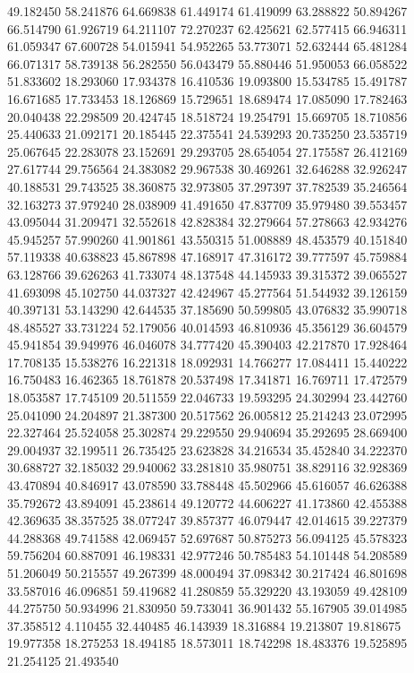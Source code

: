 49.182450
58.241876
64.669838
61.449174
61.419099
63.288822
50.894267
66.514790
61.926719
64.211107
72.270237
62.425621
62.577415
66.946311
61.059347
67.600728
54.015941
54.952265
53.773071
52.632444
65.481284
66.071317
58.739138
56.282550
56.043479
55.880446
51.950053
66.058522
51.833602
18.293060
17.934378
16.410536
19.093800
15.534785
15.491787
16.671685
17.733453
18.126869
15.729651
18.689474
17.085090
17.782463
20.040438
22.298509
20.424745
18.518724
19.254791
15.669705
18.710856
25.440633
21.092171
20.185445
22.375541
24.539293
20.735250
23.535719
25.067645
22.283078
23.152691
29.293705
28.654054
27.175587
26.412169
27.617744
29.756564
24.383082
29.967538
30.469261
32.646288
32.926247
40.188531
29.743525
38.360875
32.973805
37.297397
37.782539
35.246564
32.163273
37.979240
28.038909
41.491650
47.837709
35.979480
39.553457
43.095044
31.209471
32.552618
42.828384
32.279664
57.278663
42.934276
45.945257
57.990260
41.901861
43.550315
51.008889
48.453579
40.151840
57.119338
40.638823
45.867898
47.168917
47.316172
39.777597
45.759884
63.128766
39.626263
41.733074
48.137548
44.145933
39.315372
39.065527
41.693098
45.102750
44.037327
42.424967
45.277564
51.544932
39.126159
40.397131
53.143290
42.644535
37.185690
50.599805
43.076832
35.990718
48.485527
33.731224
52.179056
40.014593
46.810936
45.356129
36.604579
45.941854
39.949976
46.046078
34.777420
45.390403
42.217870
17.928464
17.708135
15.538276
16.221318
18.092931
14.766277
17.084411
15.440222
16.750483
16.462365
18.761878
20.537498
17.341871
16.769711
17.472579
18.053587
17.745109
20.511559
22.046733
19.593295
24.302994
23.442760
25.041090
24.204897
21.387300
20.517562
26.005812
25.214243
23.072995
22.327464
25.524058
25.302874
29.229550
29.940694
35.292695
28.669400
29.004937
32.199511
26.735425
23.623828
34.216534
35.452840
34.222370
30.688727
32.185032
29.940062
33.281810
35.980751
38.829116
32.928369
43.470894
40.846917
43.078590
33.788448
45.502966
45.616057
46.626388
35.792672
43.894091
45.238614
49.120772
44.606227
41.173860
42.455388
42.369635
38.357525
38.077247
39.857377
46.079447
42.014615
39.227379
44.288368
49.741588
42.069457
52.697687
50.875273
56.094125
45.578323
59.756204
60.887091
46.198331
42.977246
50.785483
54.101448
54.208589
51.206049
50.215557
49.267399
48.000494
37.098342
30.217424
46.801698
33.587016
46.096851
59.419682
41.280859
55.329220
43.193059
49.428109
44.275750
50.934996
21.830950
59.733041
36.901432
55.167905
39.014985
37.358512
4.110455
32.440485
46.143939
18.316884
19.213807
19.818675
19.977358
18.275253
18.494185
18.573011
18.742298
18.483376
19.525895
21.254125
21.493540
